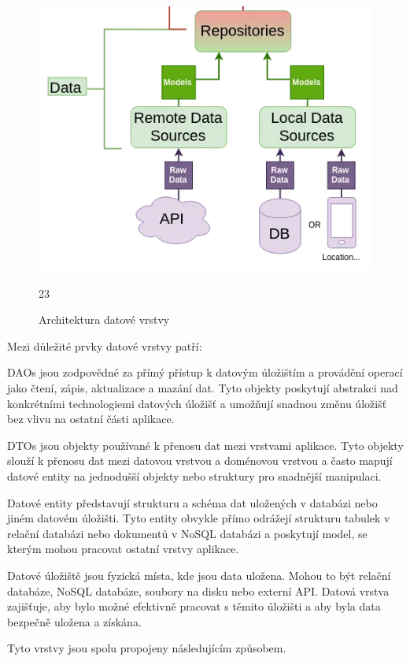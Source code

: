 \begin{figure}[H]
  \centering
  \includegraphics[width=.5\textwidth]{data_layer_diagram.png}
  \caption{Architektura datové vrstvy}
  \label{fig:arch_data_layer}23
\end{figure}


Mezi důležité prvky datové vrstvy patří:

DAOs jsou zodpovědné za přímý přístup k datovým úložištím a provádění operací jako čtení, zápis, aktualizace a mazání dat. Tyto objekty 
poskytují abstrakci nad konkrétními technologiemi datových úložišť a umožňují snadnou změnu úložišť bez vlivu na ostatní části aplikace.

DTOs jsou objekty používané k přenosu dat mezi vrstvami aplikace. Tyto objekty slouží k přenosu dat mezi datovou vrstvou a doménovou 
vrstvou a často mapují datové entity na jednodušší objekty nebo struktury pro snadnější manipulaci.

Datové entity představují strukturu a schéma dat uložených v databázi nebo jiném datovém úložišti. Tyto entity obvykle přímo odrážejí
strukturu tabulek v relační databázi nebo dokumentů v NoSQL databázi a poskytují model, se kterým mohou pracovat ostatní vrstvy aplikace.

Datové úložiště jsou fyzická místa, kde jsou data uložena. Mohou to být relační databáze, NoSQL databáze, soubory na disku nebo externí API. 
Datová vrstva zajišťuje, aby bylo možné efektivně pracovat s těmito úložišti a aby byla data bezpečně uložena a získána.

\bigskip

Tyto vrstvy jsou spolu propojeny následujícím způsobem.

